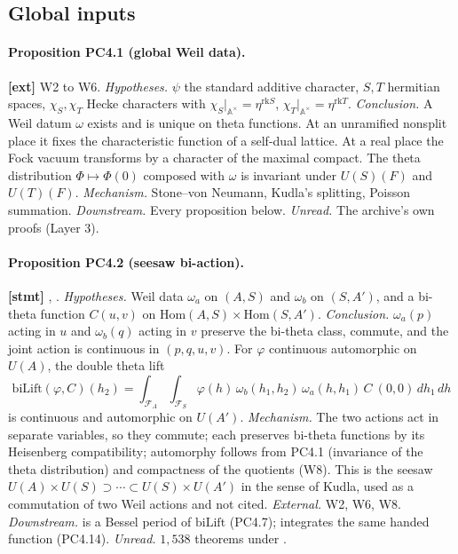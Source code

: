 \documentclass[11pt]{article}
\begin{document}
\subsection{Global inputs}

\paragraph{Proposition PC4.1 (global Weil data).} \textbf{[ext]} W2 to W6.
\emph{Hypotheses.} $\psi$ the standard additive character, $S,T$ hermitian spaces, $\chi_S,\chi_T$ Hecke characters with $\chi_S|_{\mathbb A^\times}=\eta^{\mathrm{rk}S}$, $\chi_T|_{\mathbb A^\times}=\eta^{\mathrm{rk}T}$. \emph{Conclusion.} A Weil datum $\omega$ exists and is unique on theta functions. At an unramified nonsplit place it fixes the characteristic function of a self-dual lattice. At a real place the Fock vacuum transforms by a character of the maximal compact. The theta distribution $\Phi\mapsto\Phi(0)$ composed with $\omega$ is invariant under $U(S)(F)$ and $U(T)(F)$. \emph{Mechanism.} Stone--von Neumann, Kudla's splitting, Poisson summation. \emph{Downstream.} Every proposition below. \emph{Unread.} The archive's own proofs (Layer 3).

\paragraph{Proposition PC4.2 (seesaw bi-action).} \textbf{[stmt]} , .
\emph{Hypotheses.} Weil data $\omega_a$ on $(A,S)$ and $\omega_b$ on $(S,A')$, and a bi-theta function $C(u,v)$ on $\mathrm{Hom}(A,S)\times\mathrm{Hom}(S,A')$. \emph{Conclusion.} $\omega_a(p)$ acting in $u$ and $\omega_b(q)$ acting in $v$ preserve the bi-theta class, commute, and the joint action is continuous in $(p,q,u,v)$. For $\varphi$ continuous automorphic on $U(A)$, the double theta lift
\[
\mathrm{biLift}(\varphi,C)(h_2)=\int_{\mathcal F_A}\int_{\mathcal F_S}\varphi(h)\,\omega_b(h_1,h_2)\,\omega_a(h,h_1)\,C\ (0,0)\,dh_1\,dh
\]
is continuous and automorphic on $U(A')$. \emph{Mechanism.} The two actions act in separate variables, so they commute; each preserves bi-theta functions by its Heisenberg compatibility; automorphy follows from PC4.1 (invariance of the theta distribution) and compactness of the quotients (W8). This is the seesaw $U(A)\times U(S)\supset\cdots\subset U(S)\times U(A')$ in the sense of Kudla, used as a commutation of two Weil actions and not cited. \emph{External.} W2, W6, W8. \emph{Downstream.}  is a Bessel period of $\mathrm{biLift}$ (PC4.7);  integrates the same handed function (PC4.14). \emph{Unread.} $1{,}538$ theorems under .
\end{document}
